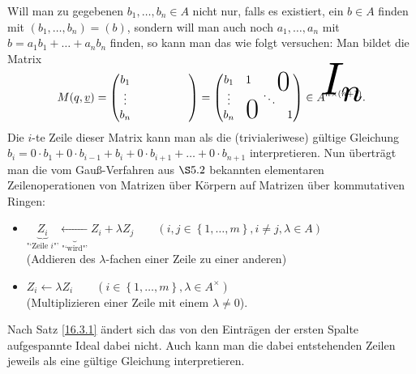 \documentclass[../../main.tex]{subfiles}
\begin{document}
\noindent Will man zu gegebenen $b_1,\ldots ,b_n\in A$ nicht nur, falls es existiert, ein $b\in A$ finden mit $(b_1,\ldots ,b_n)=(b)$, sondern will man auch noch $a_1,\ldots ,a_n$ mit $b=a_1b_1+\ldots +a_nb_n$ finden, so kann man das wie folgt versuchen: Man bildet die Matrix
\begin{align*}
M(q,\underline{v})=\begin{pmatrix*}
b_1 & & & & & \\ \vdots &  & & & & \\
b_n &  & & & & \tikz[remember picture]\node[inner sep=0pt] (b) { };
\end{pmatrix*}=
\begin{pmatrix} b_1 & 1 & \multicolumn{2}{c}{\text{\kern 1em\smash{\raisebox{-1.5ex}{\Huge 0}}}} \\ \vdots & & \ddots &  \\
b_n & \multicolumn{2}{c}{\text{\kern-1.5em\smash{\raisebox{0ex}{\Huge 0}}}} & 1
\end{pmatrix}\in A^{n\times (n+1)}.
\begin{tikzpicture}[overlay, remember picture]
\node at (b.south) [anchor=center,yshift=0.6cm, xshift=-0.7cm, scale=4] {$I_n$};
\end{tikzpicture}
\end{align*}
Die $i$-te Zeile dieser Matrix kann man als die (trivialeriwese) gültige Gleichung $b_i=0\cdot b_1+0\cdot b_{i-1}+b_i+0\cdot b_{i+1}+\ldots +0\cdot b_{n+1}$ interpretieren. Nun überträgt man die vom Gauß-Verfahren aus $\S 5.2$ bekannten elementaren Zeilenoperationen von Matrizen über Körpern auf Matrizen über kommutativen Ringen:
\begin{itemize}
\item
$\underbrace{Z_i}_\text{"`Zeile $i$"'}\underbrace{\leftarrow}_\text{"`wird"'} Z_i+\lambda Z_j
\qquad(i,j\in \left\{1,\ldots,m\right\}, i\neq j, \lambda\in A)$\\
(Addieren des $\lambda$-fachen einer Zeile zu einer anderen)
\item
$Z_i\leftarrow \lambda Z_i\qquad(i\in\left\{1,\ldots,m\right\},\lambda\in A^\times)$\\
(Multiplizieren einer Zeile mit einem $\lambda\neq 0$).
\end{itemize}
Nach Satz \ref{16.3.1} ändert sich das von den Einträgen der ersten Spalte aufgespannte Ideal dabei nicht. Auch kann man die dabei entstehenden Zeilen jeweils als eine gültige Gleichung interpretieren.\\
\end{document}
